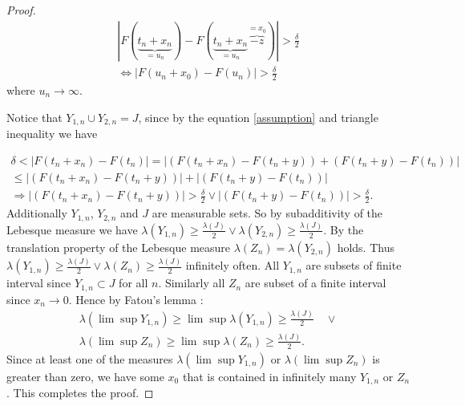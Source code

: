 \documentclass[english,12pt,a4paper,pdftex,sci,utf8]{aaltothesis} %
\begin{document}
\begin{proof}
\begin{equation*}
\begin{split}
\left| F(\underbrace{t_n+x_n}_{=u_n})-F(\underbrace{t_n+x_n}_{=u_n}\overbrace{-z}^{=x_0}) \right| > \frac{\delta}{2} \\
\Leftrightarrow \left| F(u_n+x_0)-F(u_n) \right| > \frac{\delta}{2}
\end{split}
\end{equation*}
where $u_n \rightarrow \infty$.

Notice that $Y_{1,n} \cup Y_{2,n}=J$, since by the equation \eqref{assumption} and triangle inequality we have

\begin{equation*}
\begin{split}
\delta < \left| F(t_n+x_n) - F(t_n) \right| = \left| (F(t_n+x_n)-F(t_n+y)) + (F(t_n+y)-F(t_n)) \right| \\
\leq \left| (F(t_n+x_n)-F(t_n+y)) \right| + \left| (F(t_n+y)-F(t_n)) \right| \\
\Rightarrow \left| (F(t_n+x_n)-F(t_n+y)) \right|>\frac{\delta}{2} \lor \left| (F(t_n+y)-F(t_n)) \right|>\frac{\delta}{2}.
\end{split}
\end{equation*}
Additionally $Y_{1,n}$, $Y_{2,n}$ and $J$ are measurable sets. So by subadditivity of the Lebesque measure we have $\lambda(Y_{1,n}) \geq \frac{\lambda(J)}{2} \lor \lambda(Y_{2,n}) \geq \frac{\lambda(J)}{2}$. By the translation property of the Lebesque measure $\lambda(Z_n)=\lambda(Y_{2,n})$ holds. Thus $\lambda(Y_{1,n}) \geq \frac{\lambda(J)}{2} \lor \lambda(Z_n) \geq \frac{\lambda(J)}{2}$ infinitely often. All $Y_{1,n}$ are subsets of finite interval since $Y_{1,n} \subset J$ for all $n$. Similarly all $Z_n$ are subset of a finite interval since $x_n \rightarrow 0$. Hence by Fatou's lemma \cite{lahiri}:
\begin{equation*}
\begin{split}
\lambda(\lim \sup Y_{1,n}) \geq \lim \sup \lambda(Y_{1,n}) \geq \frac{\lambda(J)}{2}  \quad \lor \\
\lambda(\lim \sup Z_{n}) \geq \lim \sup \lambda(Z_{n}) \geq \frac{\lambda(J)}{2}.
\end{split}
\label{fatouapply}
\end{equation*}
Since at least one of the measures $\lambda(\lim \sup Y_{1,n})$ or $\lambda(\lim \sup Z_{n})$ is greater than zero, we have some $x_0$ that is contained in infinitely many $Y_{1,n}$ or $Z_n$. This completes the proof.
\end{proof}
\end{document}

